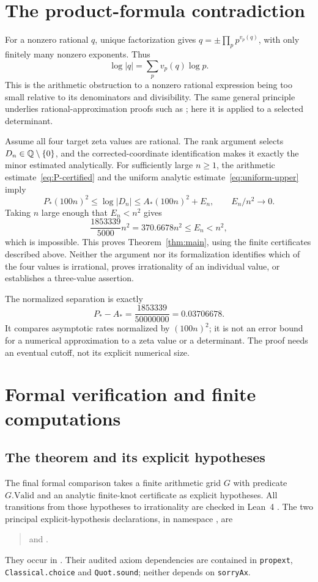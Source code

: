 \section{The product-formula contradiction}\label{sec:contradiction}
For a nonzero rational $q$, unique factorization gives
$q=\pm\prod_pp^{v_p(q)}$, with only finitely many nonzero exponents.
Thus
\begin{equation}\label{eq:product-formula}
 \log|q|=\sum_pv_p(q)\log p.
\end{equation}
This is the arithmetic obstruction to a nonzero rational expression being
too small relative to its denominators and divisibility. The same general
principle underlies rational-approximation proofs such as
\cite{Apery,Beukers}; here it is applied to a selected determinant.

Assume all four target zeta values are rational. The rank argument selects
$D_n\in\mathbb Q\setminus\{0\}$, and the corrected-coordinate identification
makes it exactly the minor estimated analytically. For sufficiently large
$n\ge1$, the arithmetic estimate~\eqref{eq:P-certified} and the uniform
analytic estimate~\eqref{eq:uniform-upper} imply
\[
 P_*(100n)^2\le\log|D_n|\le A_*(100n)^2+E_n,
 \qquad E_n/n^2\longrightarrow0.
\]
Taking $n$ large enough that $E_n<n^2$ gives
\[
 \frac{1853339}{5000}n^2=370.6678n^2
 \le E_n<n^2,
\]
which is impossible. This proves Theorem~\ref{thm:main}, using the finite
certificates described above. Neither the argument nor its formalization
identifies which of the four values is irrational, proves irrationality
of an individual value, or establishes a three-value assertion.

The normalized separation is exactly
\[
 P_*-A_* =\frac{1853339}{50000000}=0.03706678.
\]
It compares asymptotic rates normalized by $(100n)^2$; it is not an error
bound for a numerical approximation to a zeta value or a determinant.
The proof needs an eventual cutoff, not its explicit numerical size.

\section{Formal verification and finite computations}\label{sec:verification}
\subsection{The theorem and its explicit hypotheses}
The final formal comparison takes a finite arithmetic grid $G$ with
predicate $G.\mathrm{Valid}$ and an analytic finite-knot certificate as
explicit hypotheses. All transitions from those hypotheses to
irrationality are checked in Lean~4 \cite{Lean4}. The two principal
explicit-hypothesis declarations, in namespace
, are
\begin{quote}\small
{} and
.
\end{quote}
They occur in .
Their audited axiom dependencies are contained in
\texttt{propext}, \texttt{Classical.choice} and \texttt{Quot.sound};
neither depends on \texttt{sorryAx}.

